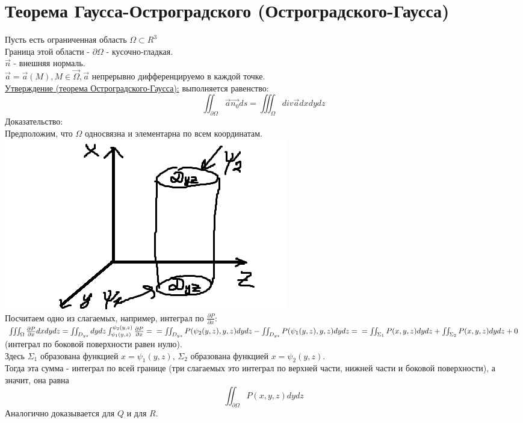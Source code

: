 \documentclass[12pt]{article}
\begin{document}
\section{Теорема Гаусса-Остроградского (Остроградского-Гаусса)}
Пусть есть ограниченная область $\Omega \subset R^3$\\
Граница этой области - $\partial \Omega$ - кусочно-гладкая.\\
$\overrightarrow{n}$ - внешняя нормаль.\\
$\overrightarrow{a} = \overrightarrow{a} (M), M \in \overrightarrow{\Omega}, \overrightarrow{a}$ непрерывно дифференцируемо в каждой точке.\\
\uline{Утверждение (теорема Остроградского-Гаусса):} выполняется равенство:\\
$$\iint_{\partial\Omega} \overrightarrow{a} \overrightarrow{n_0} ds = \iiint_{\Omega} div \overrightarrow{a} dxdydz$$
Доказательство:\\
Предположим, что $\Omega$ односвязна и элементарна по всем координатам.\\
\includegraphics{ostrogradGaussProof}\\
Посчитаем одно из слагаемых, например, интеграл по $\frac{\partial P}{\partial x}$:\\
$\iiint_\Omega \frac{\partial P}{\partial x} dxdydz = \iint_{D_{yz}} dydz \int_{\psi_1(y,z)}^{\psi_2(y,z)} \frac{\partial P}{\partial x} =\\= \iint_{D_{yz}} P(\psi_2(y,z),y,z)dydz-\iint_{D_{yz}} P(\psi_1(y,z),y,z)dydz =\\= \iint_{\Sigma_1} P(x,y,z) dydz + \iint_{\Sigma_2} P(x,y,z) dydz + 0$ (интеграл по боковой поверхности равен нулю).\\
Здесь $\Sigma_1$ образована функцией $x = \psi_1(y,z)$, $\Sigma_2$ образована функцией $x = \psi_2(y,z)$.\\
Тогда эта сумма - интеграл по всей границе (три слагаемых это интеграл по верхней части, нижней части и боковой поверхности), а значит, она равна\\
$$\iint_{\partial \Omega} P(x,y,z) dydz$$
Аналогично доказывается для $Q$ и для $R$.\\
\end{document}
